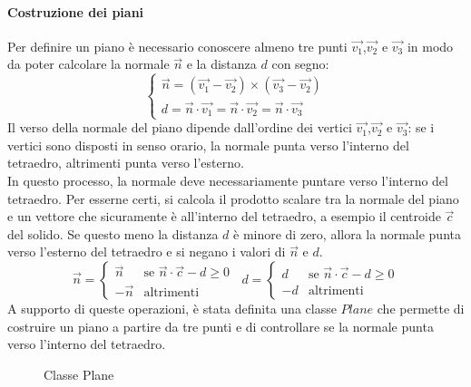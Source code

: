 \paragraph{Costruzione dei piani}
Per definire un piano è necessario conoscere almeno tre punti $\vec{v_1}$,$\vec{v_2}$ e $\vec{v_3}$ in modo da poter calcolare la normale $\vec{n}$ e la distanza $d$ con segno:
\begin{equation}
  \begin{cases}
    \vec{n} = (\vec{v_1} - \vec{v_2}) \times (\vec{v_3} - \vec{v_2}) \\
    d = \vec{n} \cdot \vec{v_1} = \vec{n} \cdot \vec{v_2} = \vec{n} \cdot \vec{v_3}
  \end{cases}
\end{equation}
Il verso della normale del piano dipende dall'ordine dei vertici $\vec{v_1}$,$\vec{v_2}$ e $\vec{v_3}$: se i vertici sono disposti in senso orario, la normale punta verso l'interno del tetraedro, altrimenti punta verso l'esterno.\\
In questo processo, la normale deve necessariamente puntare verso l'interno del tetraedro.
Per esserne certi, si calcola il prodotto scalare tra la normale del piano e un vettore che sicuramente è all'interno del tetraedro, a esempio il centroide $\vec{c}$ del solido. Se questo meno la distanza $d$ è minore di zero, allora la normale punta verso l'esterno del tetraedro e si negano i valori di $\vec{n}$ e $d$.
\begin{equation}
  \vec{n}  =
  \begin{cases}
    \vec{n}  & \text{se } \vec{n} \cdot \vec{c} - d \geq 0 \\
    -\vec{n} & \text{altrimenti}
  \end{cases} \;\;
  d        =
  \begin{cases}
    d  & \text{se } \vec{n} \cdot \vec{c} - d \geq 0 \\
    -d & \text{altrimenti}
  \end{cases}
\end{equation}
A supporto di queste operazioni, è stata definita una classe $Plane$ che permette di costruire un piano a partire da tre punti e di controllare se la normale punta verso l'interno del tetraedro.
\begin{figure}[H]
  \centering
  \caption{Classe Plane}
\end{figure}
